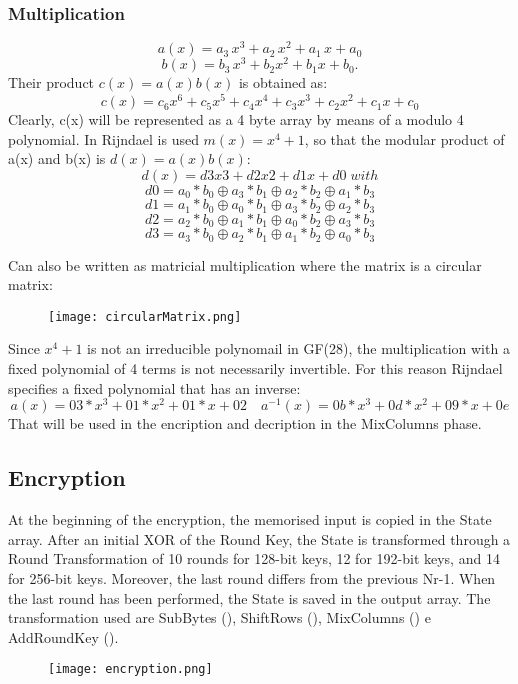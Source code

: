 \documentclass{article}
\begin{document}
\subsubsection{Multiplication}
\[a(x) = a_3\, x^3+a_2\, x^2+a_1\, x + a_0\]
\[b(x) = b_3\, x^3+ b_2 x^2+ b_1 x + b_0.\]
Their product $c (x) = a (x) b (x)$ is obtained as:
\[c (x) = c_6 x^6+c_5 x^5 + c_4x^4+ c_3 x^3+ c_2 x^2+c_1 x + c_0\]
Clearly, c(x) will be represented as a 4 byte array by means of a modulo 4 polynomial. In Rijndael is used $m(x ) = x^4+ 1$, so that the modular product of a(x) and b(x) is $d (x) = a (x) b (x)$:
\[d (x) = d3 x3+ d2x2+ d1 x + d0\; with\] 
\[d0= a_0* b_0\oplus   a_3* b_1\oplus  a_2* b_2\oplus   a_1* b_3\]
\[d1= a_1* b_0\oplus   a_0* b_1\oplus  a_3* b_2\oplus   a_2* b_3\]
\[d2= a_2* b_0\oplus   a_1* b_1\oplus  a_0* b_2\oplus   a_3* b_3\]
\[d3= a_3* b_0\oplus   a_2* b_1\oplus  a_1* b_2\oplus   a_0* b_3\]

Can also be written as matricial multiplication where the matrix is a circular matrix: 
\begin{figure}[htb]
	\begin{center}
  		\texttt{[image: circularMatrix.png]} 
 	\end{center}
\end{figure}

Since $x^4+ 1$ is not an irreducible polynomail in GF(28), the multiplication with a fixed polynomial of 4 terms is not necessarily invertible. For this reason Rijndael specifies a fixed polynomial that has an inverse: 
  \[ a(x) = {03}*x^3 + {01}*x^2+ {01}*x + {02} \quad a^{-1}(x) = {0b}*x^3 + {0d}*x^2+ {09}*x + {0e}\]
That will be used in the encription and decription in the MixColumns phase.


\subsection{Encryption}
At the beginning of the encryption, the memorised input is copied in the State array. After an initial XOR of the Round Key, the State is transformed through a Round Transformation of 10 rounds for 128-bit keys, 12 for 192-bit keys, and 14 for 256-bit keys. Moreover, the last round differs from the previous Nr-1. When the last round has been performed, the State is saved in the output array.
The transformation used are SubBytes (), ShiftRows (), MixColumns () e AddRoundKey ().
\begin{figure}[htb]
	\begin{center}
  		\texttt{[image: encryption.png]} 
 	\end{center}
\end{figure}
\end{document}
